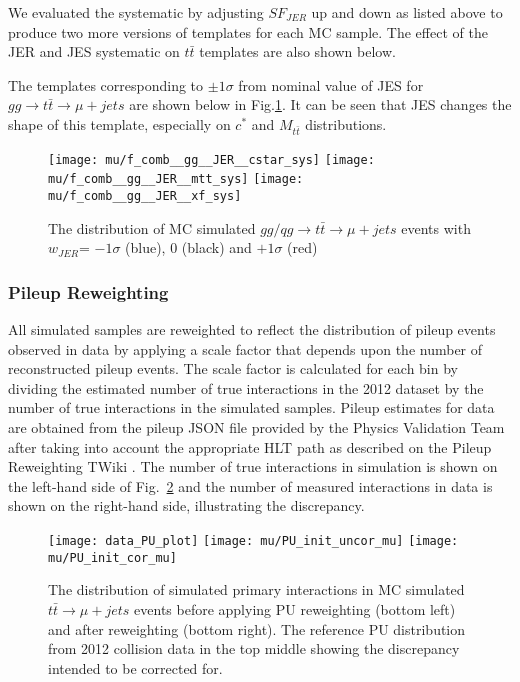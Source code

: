 \documentclass{cmspaperpdf}
\begin{document}
We evaluated the systematic by adjusting $SF_{JER}$ up and down as listed above to produce two more versions of templates for each MC sample. The effect of the JER and JES systematic on $t\bar{t}$ templates are also shown below.

The templates corresponding to $\pm 1\sigma$ from nominal value of JES for $gg\rightarrow t\bar{t}\rightarrow \mu+jets$ are shown below in Fig.\ref{fig:gg_JER_templates}. It can be seen that JES changes the shape of this template, especially on $c^*$ and $M_{t\bar{t}}$ distributions.

\begin{figure}[hbt]
  \begin{center}
    \texttt{[image: mu/f\_comb\_\_gg\_\_JER\_\_cstar\_sys]}
    \texttt{[image: mu/f\_comb\_\_gg\_\_JER\_\_mtt\_sys]}
    \texttt{[image: mu/f\_comb\_\_gg\_\_JER\_\_xf\_sys]}

  \caption{\small The distribution of MC simulated $gg/qg\rightarrow t\bar{t}\rightarrow \mu+jets$ events with $w_{JER}$= $-1\sigma$ (blue), 0 (black) and $+1\sigma$ (red)}
    \label{fig:gg_JER_templates}
  \end{center}
\end{figure}



\subsubsection{Pileup Reweighting}

All simulated samples are reweighted to reflect the distribution of pileup events observed in data by applying a scale factor that depends upon the number of reconstructed pileup events. The scale factor is calculated for each bin by dividing the estimated number of true interactions in the 2012 dataset by the number of true interactions in the simulated samples. Pileup estimates for data are obtained from the pileup JSON file provided by the Physics Validation Team after taking into account the appropriate HLT path as described on the Pileup Reweighting TWiki \cite{pileup_reweighting_twiki}. The number of true interactions in simulation is shown on the left-hand side of Fig.~\ref{fig:MC_and_data_pileup} and the number of measured interactions in data is shown on the right-hand side, illustrating the discrepancy.

\begin{figure}[hbt]
  \begin{center}
    \texttt{[image: data\_PU\_plot]}  
    \texttt{[image: mu/PU\_init\_uncor\_mu]}
    \texttt{[image: mu/PU\_init\_cor\_mu]}
  \caption{\small The distribution of simulated primary interactions in MC simulated $t\bar{t}\rightarrow \mu +jets$ events before applying PU reweighting (bottom left) and after reweighting (bottom right). The reference PU distribution from 2012 collision data in the top middle showing the discrepancy intended to be corrected for. }
    \label{fig:MC_and_data_pileup}
  \end{center}
\end{figure}
\end{document}
